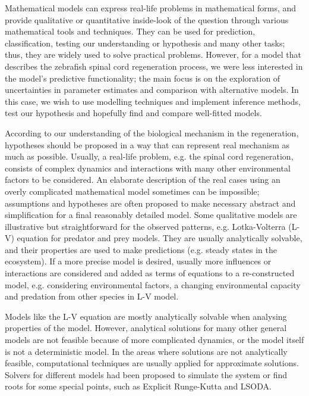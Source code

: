 
Mathematical models can express real-life problems in mathematical forms, and provide qualitative or quantitative inside-look of the question through various mathematical tools and techniques. They can be used for prediction, classification, testing our understanding or hypothesis and many other tasks; thus, they are widely used to solve practical problems. However, for a model that describes the zebrafish spinal cord regeneration process, we were less interested in the model's predictive functionality; the main focus is on the exploration of uncertainties in parameter estimates and comparison with alternative models. In this case, we wish to use modelling techniques and implement inference methods, test our hypothesis and hopefully find and compare well-fitted models.

According to our understanding of the biological mechanism in the regeneration, hypotheses should be proposed in a way that can represent real mechanism as much as possible. Usually, a real-life problem, e.g. the spinal cord regeneration, consists of complex dynamics and interactions with many other environmental factors to be considered. An elaborate description of the real cases using an overly complicated mathematical model sometimes can be impossible; assumptions and hypotheses are often proposed to make necessary abstract and simplification for a final reasonably detailed model. Some qualitative models are illustrative but straightforward for the observed patterns, e.g. Lotka-Volterra (L-V) equation for predator and prey models. They are usually analytically solvable, and their properties are used to make predictions (e.g. steady states in the ecosystem). If a more precise model is desired, usually more influences or interactions are considered and added as terms of equations to a re-constructed model, e.g. considering environmental factors, a changing environmental capacity and predation from other species in L-V model.

Models like the L-V equation are mostly analytically solvable when analysing properties of the model. However, analytical solutions for many other general models are not feasible because of more complicated dynamics, or the model itself is not a deterministic model. In the areas where solutions are not analytically feasible, computational techniques are usually applied for approximate solutions. Solvers for different models had been proposed to simulate the system or find roots for some special points, such as Explicit Runge-Kutta \cite{dormand1980family} and LSODA.

